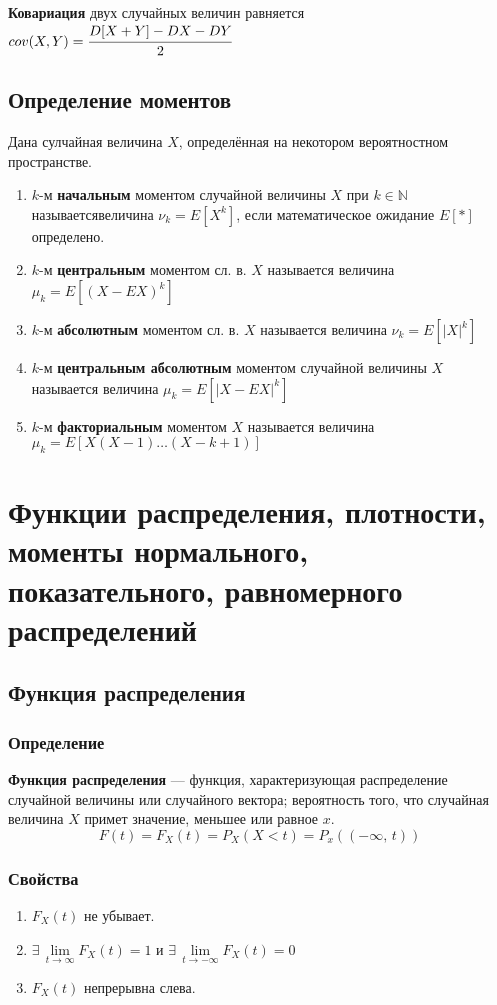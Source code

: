 \documentclass{article}
\newcommand{\numberset}[1]{\mathbb{#1}}
\newcommand{\N}{\numberset{N}}
\begin{document}
\textbf{Ковариация} двух случайных величин равняется $cov(X,Y)=\cfrac{D[X+Y]-DX-DY}{2}$
\subsection{Определение моментов}
Дана сулчайная величина $X$, определённая на некотором вероятностном пространстве.
\begin{enumerate}
    \item $k$-м \textbf{начальным} моментом случайной величины $X$ при $k\in\N$ называется\quad величина $\nu_k=E[X^k]$, если математическое ожидание $E[*]$ определено.
    \item $k$-м \textbf{центральным} моментом сл. в. $X$ называется величина $\mu_k=E[(X-EX)^k]$
    \item $k$-м \textbf{абсолютным} моментом сл. в. $X$ называется величина $\nu_k=E[|X|^k]$
    \item $k$-м \textbf{центральным абсолютным} моментом случайной величины $X$ называется величина $\mu_k=E[|X-EX|^k]$
    \item $k$-м \textbf{факториальным} моментом $X$ называется величина $\mu_k=E[X(X-1)\dots (X-k+1)]$
\end{enumerate}
\newpage
\section{Функции распределения, плотности, моменты нормального, показательного, равномерного распределений}
\subsection{Функция распределения}
\subsubsection{Определение}
\textbf{Функция распределения} — функция, характеризующая распределение случайной величины или случайного вектора; вероятность того, что случайная величина $X$ примет значение, меньшее или равное $x$.
$$ F(t)=F_X(t)=P_X(X<t)=P_x((-\infty,\,t)) $$
\subsubsection{Свойства}
\begin{enumerate}
    \item $F_X(t)$ не убывает.
    \item $ \exists\,\lim\limits_{t\to\infty}F_X(t)=1 $ и $\exists\,\lim\limits_{t\to-\infty}F_X(t)=0$
    \item $F_X(t)$ непрерывна слева.
\end{enumerate}
\end{document}
